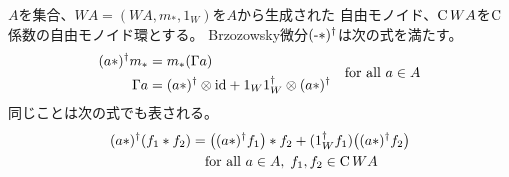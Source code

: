 		\begin{proposition}[Brzozowsky微分の積との交換関係]\label{prop:Brzozowsky微分の積との交換関係} %
			$A$を集合、$WA=(WA,m_*,1_W)$を$A$から生成された
			自由モノイド、$\operatorname{C}WA$を$\operatorname{C}$係数の自由モノイド環とする。
			Brzozowsky微分$(\myhere*)^\dag$は次の式を満たす。
			\begin{equation*} %
				\begin{split}
					(a*)^\dag m_* &= m_*(\Gamma a) \\
					\Gamma a &= (a*)^\dag\otimes \myid + 1_W1_W^\dag
						\otimes (a*)^\dag
				\end{split} \quad\text{for all }a\in A
			\end{equation*} %
			同じことは次の式でも表される。
			\begin{equation*}\begin{split} %
				(a*)^\dag(f_1*f_2) &= \bigl((a*)^\dag f_1\bigr)*f_2 
					+ (1_W^\dag f_1)\bigl((a*)^\dag f_2\bigr) \\
				&\quad\text{for all }a\in A,\;f_1,f_2\in \myop{C}WA
			\end{split}\end{equation*} %
		\end{proposition} %

